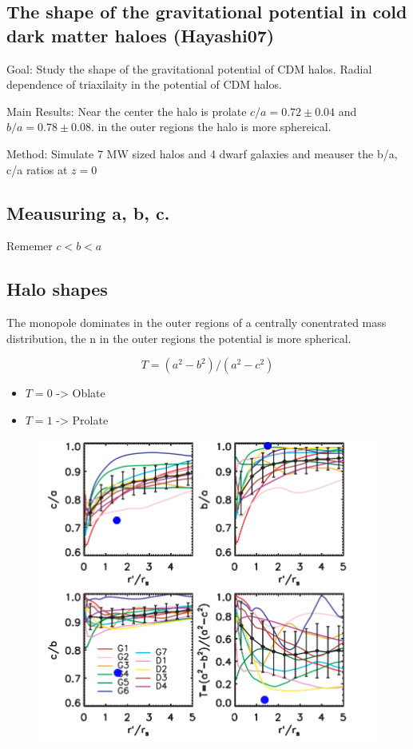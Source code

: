 \documentclass[12pt]{article}
\begin{document}
\subsection{The shape of the gravitational potential in cold dark matter haloes (Hayashi07)}

Goal: Study the shape of the gravitational potential of CDM halos. Radial dependence of triaxilaity in the potential of CDM halos.
 
Main Results: Near the center the halo is prolate $c/a = 0.72 \pm 0.04$
and $b/a = 0.78 \pm 0.08$. in the outer regions the halo is more sphereical.

Method: Simulate 7 MW sized halos and 4 dwarf galaxies and meauser the b/a, c/a ratios at $z=0$
\subsection{Meausuring a, b, c.}

Rememer $c<b<a$

\subsection{Halo shapes}

The monopole dominates in the outer regions of a centrally conentrated mass distribution, the n in the outer
regions the potential is more spherical. 

\begin{equation}
T = (a^2 - b^2)/(a^2-c^2)
\end{equation}

\begin{itemize}
\item $T=0$ -> Oblate
\item $T=1$ -> Prolate 
\end{itemize}


\begin{figure}[H]
\centering
\includegraphics[scale=0.5]{hayashimod.png}
\end{figure}
\end{document}
